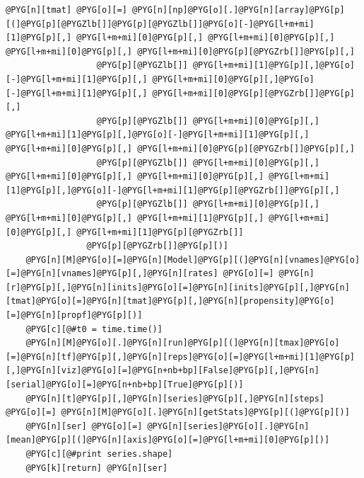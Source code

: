 \documentclass[a4paper,10pt,english]{manual}
\begin{document}
\begin{Verbatim}[commandchars=@\[\]]
    @PYG[n][tmat] @PYG[o][=] @PYG[n][np]@PYG[o][.]@PYG[n][array]@PYG[p][(]@PYG[p][@PYGZlb[]]@PYG[p][@PYGZlb[]]@PYG[o][-]@PYG[l+m+mi][1]@PYG[p][,] @PYG[l+m+mi][0]@PYG[p][,] @PYG[l+m+mi][0]@PYG[p][,] @PYG[l+m+mi][0]@PYG[p][,] @PYG[l+m+mi][0]@PYG[p][@PYGZrb[]]@PYG[p][,]
                  @PYG[p][@PYGZlb[]] @PYG[l+m+mi][1]@PYG[p][,]@PYG[o][-]@PYG[l+m+mi][1]@PYG[p][,] @PYG[l+m+mi][0]@PYG[p][,]@PYG[o][-]@PYG[l+m+mi][1]@PYG[p][,] @PYG[l+m+mi][0]@PYG[p][@PYGZrb[]]@PYG[p][,]
                  @PYG[p][@PYGZlb[]] @PYG[l+m+mi][0]@PYG[p][,] @PYG[l+m+mi][1]@PYG[p][,]@PYG[o][-]@PYG[l+m+mi][1]@PYG[p][,] @PYG[l+m+mi][0]@PYG[p][,] @PYG[l+m+mi][0]@PYG[p][@PYGZrb[]]@PYG[p][,]
                  @PYG[p][@PYGZlb[]] @PYG[l+m+mi][0]@PYG[p][,] @PYG[l+m+mi][0]@PYG[p][,] @PYG[l+m+mi][0]@PYG[p][,] @PYG[l+m+mi][1]@PYG[p][,]@PYG[o][-]@PYG[l+m+mi][1]@PYG[p][@PYGZrb[]]@PYG[p][,]
                  @PYG[p][@PYGZlb[]] @PYG[l+m+mi][0]@PYG[p][,] @PYG[l+m+mi][0]@PYG[p][,] @PYG[l+m+mi][1]@PYG[p][,] @PYG[l+m+mi][0]@PYG[p][,] @PYG[l+m+mi][1]@PYG[p][@PYGZrb[]]
                @PYG[p][@PYGZrb[]]@PYG[p][)]
    @PYG[n][M]@PYG[o][=]@PYG[n][Model]@PYG[p][(]@PYG[n][vnames]@PYG[o][=]@PYG[n][vnames]@PYG[p][,]@PYG[n][rates] @PYG[o][=] @PYG[n][r]@PYG[p][,]@PYG[n][inits]@PYG[o][=]@PYG[n][inits]@PYG[p][,]@PYG[n][tmat]@PYG[o][=]@PYG[n][tmat]@PYG[p][,]@PYG[n][propensity]@PYG[o][=]@PYG[n][propf]@PYG[p][)]
    @PYG[c][@#t0 = time.time()]
    @PYG[n][M]@PYG[o][.]@PYG[n][run]@PYG[p][(]@PYG[n][tmax]@PYG[o][=]@PYG[n][tf]@PYG[p][,]@PYG[n][reps]@PYG[o][=]@PYG[l+m+mi][1]@PYG[p][,]@PYG[n][viz]@PYG[o][=]@PYG[n+nb+bp][False]@PYG[p][,]@PYG[n][serial]@PYG[o][=]@PYG[n+nb+bp][True]@PYG[p][)]
    @PYG[n][t]@PYG[p][,]@PYG[n][series]@PYG[p][,]@PYG[n][steps] @PYG[o][=] @PYG[n][M]@PYG[o][.]@PYG[n][getStats]@PYG[p][(]@PYG[p][)]
    @PYG[n][ser] @PYG[o][=] @PYG[n][series]@PYG[o][.]@PYG[n][mean]@PYG[p][(]@PYG[n][axis]@PYG[o][=]@PYG[l+m+mi][0]@PYG[p][)]
    @PYG[c][@#print series.shape]
    @PYG[k][return] @PYG[n][ser]


\end{Verbatim}
\end{document}
